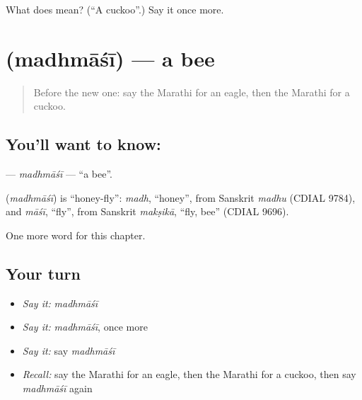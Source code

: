 \begin{tcolorbox}[breakable,colback=teal!4,colframe=teal!35!black,title={Before you move on}]
What does  mean? (\textquotedblleft{}A cuckoo\textquotedblright{}.) Say it once more.
\end{tcolorbox}
\section[\texorpdfstring{\mr{मधमाशी} (madhmāśī)}{मधमाशी (madhmāśī)}]{ (madhmāśī) — a bee}

\label{lesson:MR-C188-madhmasi}



\begin{quote}
Before the new one: say the Marathi for an eagle, then the Marathi for a cuckoo.
\end{quote}

\subsection*{You'll want to know: }
\textbf{} — \emph{madhmāśī} — \textquotedblleft{}a bee\textquotedblright{}.

\begin{cousinweb}
\textbf{} (\emph{madhmāśī}) is \textquotedblleft{}honey-fly\textquotedblright{}: \emph{madh}, \textquotedblleft{}honey\textquotedblright{}, from Sanskrit \emph{madhu} (CDIAL 9784), and \emph{māśī}, \textquotedblleft{}fly\textquotedblright{}, from Sanskrit \emph{makṣikā}, \textquotedblleft{}fly, bee\textquotedblright{} (CDIAL 9696).
\end{cousinweb}

\begin{grammarlens}[title={What you've built}]
One more word for this chapter.
\end{grammarlens}

\subsection*{Your turn}
\begin{itemize}
\raggedright
  \item \emph{Say it:} \emph{madhmāśī}
  \item \emph{Say it:} \emph{madhmāśī}, once more
  \item \emph{Say it:} say \emph{madhmāśī}
  \item \emph{Recall:} say the Marathi for an eagle, then the Marathi for a cuckoo, then say \emph{madhmāśī} again
\end{itemize}

